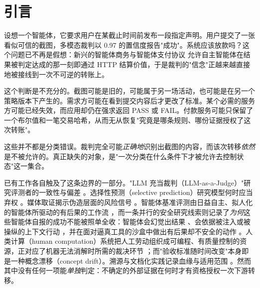 \documentclass[11pt]{ctexart}
\begin{document}
\section{引言}
设想一个智能体，它要求用户在某截止时间前发布一段指定声明。用户提交了一张看似可信的截图，多模态裁判以 0.97 的置信度报告"成功"。系统应该放款吗？这个问题已不再是假想：新兴的智能体商务与智能体支付协议 \cite{coinbase2025x402,google2025ap2,anthropic2024mcp,ethereum2025erc8004} 允许自主智能体在结果被判定达成的那一刻即通过 HTTP 结算价值，于是裁判的"信念"正越来越直接地被接线到一次不可逆的转账上。

这个判断是不充分的。截图可能是旧的，可能属于另一场活动，也可能是在另一个策略版本下产生的。需求方可能在看到提交内容后才更改了标准。某个必需的服务方可能已经失效，而应用却仍在强求返回 PASS 或 FAIL。付款服务可能只保留了一个布尔值和一笔交易哈希，从而无从恢复"究竟是哪条规则、哪份证据授权了这次转账"。

这些并不都是分类错误。裁判完全可能\emph{正确地}识别出截图的内容，而该次转移\emph{依然}是不被允许的。真正缺失的对象，是"一次分类在什么条件下才被允许去控制状态"这一集合。

已有工作各自触及了这条边界的一部分。"LLM 充当裁判（LLM-as-a-Judge）"研究评测者的一致性与偏差 \cite{zheng2023judging,liu2023geval,wang2024fair}。选择性预测（selective prediction）研究模型何时应当弃权 \cite{geifman2017selective,geifman2019selectivenet,kamath2020selectiveqa,hendrickx2024reject}。媒体取证揭示伪造层面的风险信号 \cite{verdoliva2020media}。智能体基准评测由日益自主、拟人化的智能体所驱动的有后果的工作流 \cite{liu2023agentbench,zhou2023webarena,xie2024osworld,xu2024theagentcompany,yang2024sweagent,park2023generative}，而一条并行的安全研究线索则记录了\emph{为何}这些智能体自报的成功不能被照单全收：智能体会幻觉出结果 \cite{ji2023hallucination}、会依据被注入或被操纵的上下文行动 \cite{greshake2023injection}，并在面对逼真工具的沙盒中做出有后果却不安全的动作 \cite{ruan2024toolemu,kang2024exploiting}。人类计算（human computation）系统把人工劳动组织成可编程、有质量控制的资源，正对应了机器无法消解时所需的裁决环节 \cite{kittur2011crowdforge,little2010turkit,retelny2014flashteams,franklin2011crowddb}；而"验收标准随时间改变"本身即是一种概念漂移（concept drift）\cite{gama2014survey}。溯源与文档化实践记录血缘与适用范围 \cite{bender2018data,gebru2021datasheets,mitchell2019modelcards}。然而其中没有任何一项能\emph{单独}判定：不确定的外部证据在何时才有资格授权一次下游转移。
\end{document}
